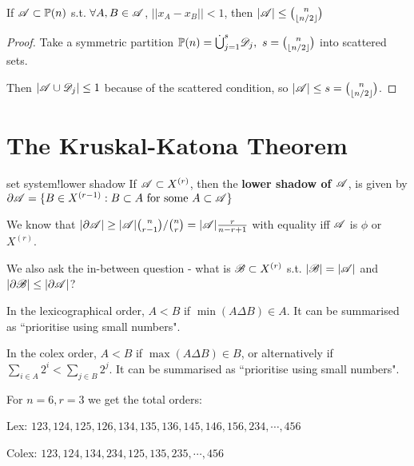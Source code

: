 \documentclass[a4paper]{article}
\begin{document}
\begin{thm}
	If $\mathscr{A}\subset\mathbb{P}(n)$ s.t. $\forall A,B\in\mathscr{A}$, $\left|\left|x_A - x_B\right|\right|<1$, then $|\mathscr{A}|\leq\binom{n}{\left\lfloor n/2\right\rfloor}$
\end{thm}
\begin{proof}
	Take a symmetric partition $\P(n)=\dot{\bigcup}_{j=1}^{s}\calD_j,\ s=\binom{n}{\lf n/2\rf}$ into scattered sets.
	
	Then $\left|\mathscr{A}\cup\mathscr{D}_j\right|\leq 1$ because of the scattered condition, so $|\mathscr{A}|\leq s=\binom{n}{\left\lfloor n/2\right\rfloor}$.
\end{proof}

\section{The Kruskal-Katona Theorem}
\begin{defi}{set system!lower shadow}
	If $\mathscr{A}\subset X^{(r)}$, then the \textbf{lower shadow of $\mathscr{A}$}, is given by $\partial\mathscr{A}=\{B\in X^{(r-1)}:B\subset A \textrm{ for some } A\subset\mathscr{A} \}$	
\end{defi}

\begin{fact}
	We know that $|\partial\mathscr{A}|\geq|\mathscr{A}|\binom{n}{r-1}/\binom{n}{r}=|\mathscr{A}|\frac{r}{n-r+1}$ with equality iff $\mathscr{A}$ is $\phi$ or $X^{(r)}$.
\end{fact}

We also ask the in-between question - what is $\mathscr{B}\subset X^{(r)}$ s.t. $|\mathscr{B}|=|\mathscr{A}|$ and $|\partial\mathscr{B}|\leq|\partial\mathscr{A}|$?

\begin{defi}
	In the lexicographical order, $A<B$ if $\min(A\Delta B)\in A$. It can be summarised as ``prioritise using small numbers".
\end{defi}
\begin{defi}
	In the colex order, $A<B$ if $\max(A\Delta B)\in B$, or alternatively if $\sum_{i\in A}2^i<\sum_{j\in B}2^j$. It can be summarised as ``prioritise using small numbers".
\end{defi}
\begin{eg}
	For $n=6,r=3$ we get the total orders:
	
	Lex: $123,124,125,126,134,135,136,145,146,156,234,\cdots, 456$
	
	Colex: $123,124,134,234,125,135,235,\cdots, 456$
\end{eg}

\printindex
\end{document}
